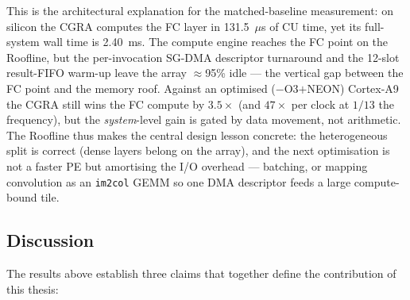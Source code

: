 This is the architectural explanation for the matched-baseline
measurement: on silicon the CGRA computes the FC layer in 131.5~$\mu$s
of CU time, yet its full-system wall time is 2.40~ms. The compute
engine reaches the FC point on the Roofline, but the per-invocation
SG-DMA descriptor turnaround and the 12-slot result-FIFO warm-up leave
the array $\approx$95\% idle --- the vertical gap between the FC point
and the memory roof. Against an optimised ($-$O3$+$NEON) Cortex-A9 the
CGRA still wins the FC compute by $3.5\times$ (and $47\times$ per clock
at $1/13$ the frequency), but the \emph{system}-level gain is gated by
data movement, not arithmetic. The Roofline thus makes the central
design lesson concrete: the heterogeneous split is correct (dense
layers belong on the array), and the next optimisation is not a faster
PE but amortising the I/O overhead --- batching, or mapping convolution
as an \texttt{im2col} GEMM so one DMA descriptor feeds a large
compute-bound tile.


\subsection{Discussion}
\label{ssec:discussion}

The results above establish three claims that together define the
contribution of this thesis:

